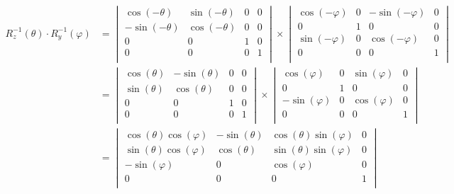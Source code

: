 \documentclass[a4paper]{article}
\theoremstyle{hangindent}
\theoremstyle{hangindent}
\begin{document}
\begin{align*}
    R^{-1}_z(\theta) \cdot R^{-1}_y(\varphi)
    &=
    \begin{vmatrix}
        \cos(-\theta)  & \sin(-\theta) & 0 & 0 \\
        -\sin(-\theta) & \cos(-\theta) & 0 & 0 \\
        0              & 0             & 1 & 0 \\
        0              & 0             & 0 & 1 \\
    \end{vmatrix}
    \times
    \begin{vmatrix}
        \cos(-\varphi) & 0 & -\sin(-\varphi) & 0 \\
        0              & 1 & 0               & 0 \\
        \sin(-\varphi) & 0 & \cos(-\varphi)  & 0 \\
        0              & 0 & 0               & 1 \\
    \end{vmatrix}
    \\ &=
    \begin{vmatrix}
        \cos(\theta) & -\sin(\theta) & 0 & 0 \\
        \sin(\theta) & \cos(\theta)  & 0 & 0 \\
        0            & 0             & 1 & 0 \\
        0            & 0             & 0 & 1 \\
    \end{vmatrix}
    \times
    \begin{vmatrix}
        \cos(\varphi)  & 0 & \sin(\varphi) & 0 \\
        0              & 1 & 0             & 0 \\
        -\sin(\varphi) & 0 & \cos(\varphi) & 0 \\
        0              & 0 & 0             & 1 \\
    \end{vmatrix}
    \\ &=
    \begin{vmatrix}
        \cos(\theta)\cos(\varphi) & -\sin(\theta) & \cos(\theta)\sin(\varphi) & 0 \\
        \sin(\theta)\cos(\varphi) & \cos(\theta)  & \sin(\theta)\sin(\varphi) & 0 \\
        -\sin(\varphi)            & 0             & \cos(\varphi)             & 0 \\
        0                         & 0             & 0                         & 1 \\
    \end{vmatrix}
\end{align*}
\end{document}

